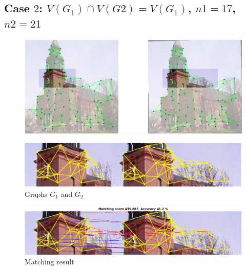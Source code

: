 \documentclass[
	fontsize=12pt,
	paper=a4,
	twoside=false,
	numbers=noenddot,
	plainheadsepline,
	toc=listof,
	toc=bibliography
]{scrartcl}
\begin{document}
\FloatBarrier

\newpage
\subsection*{ Case $2$: $V(G_1)\cap V(G2) = V(G_1)$, $n1=17$, $n2=21$}
\begin{figure} [htb] \centering
	\includegraphics[scale = 0.35]{test2/subregions.png}
\end{figure}
\begin{figure} [hb] \centering
	\includegraphics[scale = 0.4]{test2/subgraphs.png}
	\caption{Graphs $G_1$ and $G_2$}
\end{figure}
\begin{figure} [hb] \centering
	\includegraphics[scale = 0.4]{test2/matching_result.png}
	\caption{ Matching result}
\end{figure}

\FloatBarrier

\newpage
\end{document}
